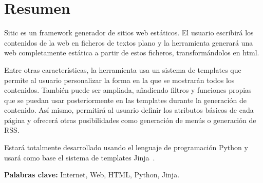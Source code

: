 \section*{Resumen}

Sitic es un framework generador de sitios web estáticos. El usuario escribirá
los contenidos de la web en ficheros de textos plano y la
herramienta generará una web completamente estática a partir de estos ficheros,
transformándolos en html.

Entre otras características, la herramienta usa un sistema de templates que permite al
usuario personalizar la forma en la que se mostrarán todos los contenidos. También puede
ser ampliada, añadiendo filtros y funciones propias que se puedan usar posteriormente en
las templates durante la generación de contenido. Así mismo, permitirá al usuario definir los
atributos básicos de cada página y ofrecerá otras posibilidades como generación de menús
o generación de RSS.

Estará totalmente desarrollado usando el lenguaje de programación Python y usará como
base el sistema de templates Jinja~\cite{jinja}.

\textbf{Palabras clave:} Internet, Web, HTML, Python, Jinja.



